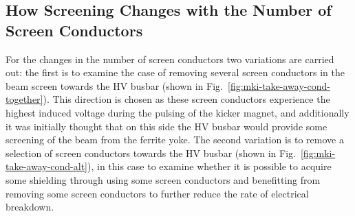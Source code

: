 \subsection{How Screening Changes with the Number of Screen Conductors}

For the changes in the number of screen conductors two variations are carried out: the first is to examine the case of removing several screen conductors in the beam screen towards the HV busbar (shown in Fig.~\ref{fig:mki-take-away-cond-together}). This direction is chosen as these screen conductors experience the highest induced voltage during the pulsing of the kicker magnet, and additionally it was initially thought that on this side the HV busbar would provide some screening of the beam from the ferrite yoke. The second variation is to remove a selection of screen conductors towards the HV busbar (shown in Fig.~\ref{fig:mki-take-away-cond-alt}), in this case to examine whether it is possible to acquire some shielding through using some screen conductors and benefitting from removing some screen conductors to further reduce the rate of electrical breakdown.

